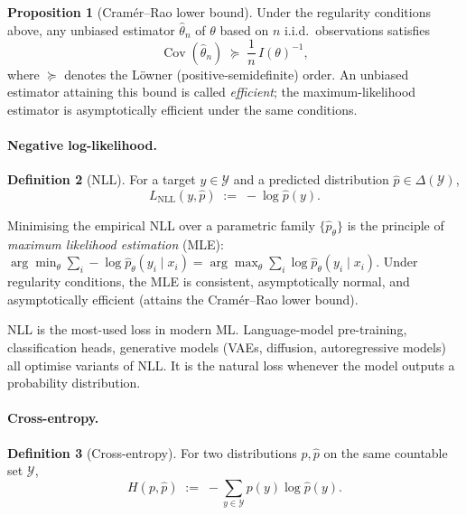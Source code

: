 \documentclass[11pt]{article}
\theoremstyle{definition}
\newtheorem{definition}{Definition}
\newtheorem{proposition}[definition]{Proposition}
\begin{document}
\begin{proposition}[Cram\'er--Rao lower bound]
Under the regularity conditions above, any unbiased estimator
$\widehat{\theta}_n$ of $\theta$ based on $n$ i.i.d.\ observations satisfies
\[
  \operatorname{Cov}(\widehat{\theta}_n) \;\succeq\; \frac{1}{n}\, I(\theta)^{-1},
\]
where $\succeq$ denotes the L\"owner (positive-semidefinite) order. An
unbiased estimator attaining this bound is called \emph{efficient}; the
maximum-likelihood estimator is asymptotically efficient under the same
conditions.
\end{proposition}

\paragraph{Negative log-likelihood.}

\begin{definition}[NLL]
For a target $y \in \mathcal{Y}$ and a predicted distribution
$\hat p \in \Delta(\mathcal{Y})$,
\[
  L_{\mathrm{NLL}}(y, \hat p) \;:=\; -\log \hat p(y).
\]
\end{definition}

\begin{mathnote}
Minimising the empirical NLL over a parametric family $\{\hat p_\theta\}$
is the principle of \emph{maximum likelihood estimation} (MLE):
$\arg\min_\theta \sum_i -\log \hat p_\theta(y_i \mid x_i) = \arg\max_\theta
\sum_i \log \hat p_\theta(y_i \mid x_i)$. Under regularity conditions, the
MLE is consistent, asymptotically normal, and asymptotically efficient
(attains the Cram\'er--Rao lower bound).
\end{mathnote}

\begin{mlnote}
NLL is the most-used loss in modern ML. Language-model pre-training,
classification heads, generative models (VAEs, diffusion, autoregressive
models) all optimise variants of NLL. It is the natural loss whenever the
model outputs a probability distribution.
\end{mlnote}

\paragraph{Cross-entropy.}

\begin{definition}[Cross-entropy]
For two distributions $p, \hat p$ on the same countable set $\mathcal{Y}$,
\[
  H(p, \hat p) \;:=\; -\sum_{y \in \mathcal{Y}} p(y) \log \hat p(y).
\]
\end{definition}
\end{document}
